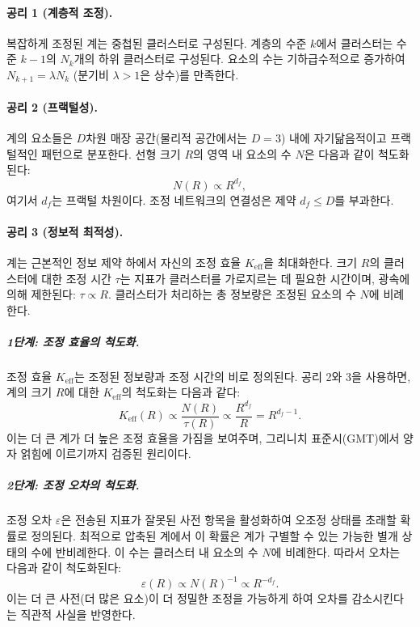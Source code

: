 \documentclass[11pt,a4paper]{article}
\newcommand{\Ke}{K_{\mathrm{eff}}}
\theoremstyle{remark}
\begin{document}
	\paragraph{공리 1 (계층적 조정).}
	복잡하게 조정된 계는 중첩된 클러스터로 구성된다. 계층의 수준 \(k\)에서 클러스터는 수준 \(k-1\)의 \(N_k\)개의 하위 클러스터로 구성된다. 요소의 수는 기하급수적으로 증가하여 \(N_{k+1} = \lambda N_k\) (분기비 \(\lambda > 1\)은 상수)를 만족한다.
	
	\paragraph{공리 2 (프랙털성).}
	계의 요소들은 \(D\)차원 매장 공간(물리적 공간에서는 \(D = 3\)) 내에 자기닮음적이고 프랙털적인 패턴으로 분포한다. 선형 크기 \(R\)의 영역 내 요소의 수 \(N\)은 다음과 같이 척도화된다:
	\begin{equation}
		N(R) \propto R^{d_f},
		\label{eq:fractal_dim}
	\end{equation}
	여기서 \(d_f\)는 프랙털 차원이다. 조정 네트워크의 연결성은 제약 \(d_f \le D\)를 부과한다.
	
	\paragraph{공리 3 (정보적 최적성).}
	계는 근본적인 정보 제약 하에서 자신의 조정 효율 \(\Ke\)을 최대화한다. 크기 \(R\)의 클러스터에 대한 조정 시간 \(\tau\)는 지표가 클러스터를 가로지르는 데 필요한 시간이며, 광속에 의해 제한된다: \(\tau \propto R\). 클러스터가 처리하는 총 정보량은 조정된 요소의 수 \(N\)에 비례한다.
	
	\subparagraph*{1단계: 조정 효율의 척도화.}
	조정 효율 \(\Ke\)는 조정된 정보량과 조정 시간의 비로 정의된다. 공리 2와 3을 사용하면, 계의 크기 \(R\)에 대한 \(\Ke\)의 척도화는 다음과 같다:
	\begin{equation}
		\Ke(R) \propto \frac{N(R)}{\tau(R)} \propto \frac{R^{d_f}}{R} = R^{d_f - 1}.
		\label{eq:keff_scale}
	\end{equation}
	이는 더 큰 계가 더 높은 조정 효율을 가짐을 보여주며, 그리니치 표준시(GMT)에서 양자 얽힘에 이르기까지 검증된 원리이다.
	
	\subparagraph*{2단계: 조정 오차의 척도화.}
	조정 오차 \(\varepsilon\)은 전송된 지표가 잘못된 사전 항목을 활성화하여 오조정 상태를 초래할 확률로 정의된다. 최적으로 압축된 계에서 이 확률은 계가 구별할 수 있는 가능한 별개 상태의 수에 반비례한다. 이 수는 클러스터 내 요소의 수 \(N\)에 비례한다. 따라서 오차는 다음과 같이 척도화된다:
	\begin{equation}
		\varepsilon(R) \propto N(R)^{-1} \propto R^{-d_f}.
		\label{eq:error_scale}
	\end{equation}
	이는 더 큰 사전(더 많은 요소)이 더 정밀한 조정을 가능하게 하여 오차를 감소시킨다는 직관적 사실을 반영한다.
	
\end{document}
